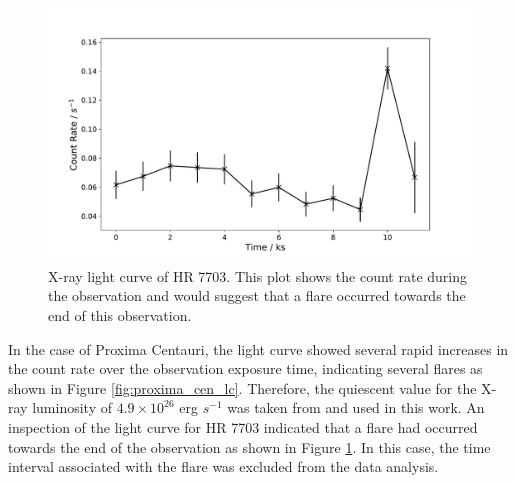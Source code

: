 \begin{figure}
    \centering
    \includegraphics[scale=0.5]{Figures/3-Xray_age/HR7703_lc.pdf}
    \caption[X-ray light curve of HR 7703]{X-ray light curve of HR 7703. This plot shows the count rate during the observation and would suggest that a flare occurred towards the end of this observation.}
    \label{fig:HR7703_lc}
\end{figure}

In the case of Proxima Centauri, the light curve showed several rapid increases in the count rate over the observation exposure time, indicating several flares as shown in Figure \ref{fig:proxima_cen_lc}. Therefore, the quiescent value for the X-ray luminosity of $4.9 \times 10^{26}$ erg $s^{-1}$ was taken from \citet{Fuhrmeister_etal_2011} and used in this work. An inspection of the light curve for HR 7703 indicated that a flare had occurred towards the end of the observation as shown in Figure \ref{fig:HR7703_lc}. In this case, the time interval associated with the flare was excluded from the data analysis.

